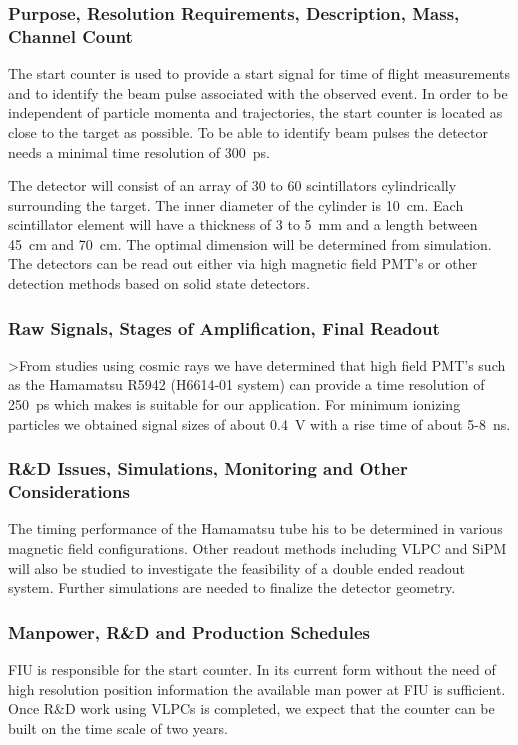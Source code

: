 \subsubsection*{Purpose, Resolution Requirements, Description, Mass, Channel Count}
The start counter is used to provide a start signal for
time of flight measurements and to identify  the beam pulse associated
with the observed event. In order to be independent of particle momenta
and trajectories, the start counter is located as close to the target as
possible. To be able to identify beam pulses the detector
needs a minimal time resolution of 300~ps. 

The detector will consist of an array of 30 to 60 scintillators
cylindrically surrounding the target. The inner diameter of the
cylinder is 10~cm. Each scintillator element will have  
a thickness of 3 to 5~mm and a length between 45~cm and
70~cm. The optimal dimension will be determined from simulation. The
detectors can be read out either via high magnetic field PMT's or
other detection methods based on solid state detectors.     

\subsubsection*{Raw Signals, Stages of Amplification, Final Readout}
>From studies using cosmic rays we have determined that high field
PMT's such as the Hamamatsu R5942 (H6614-01 system) can provide a time
resolution of 250~ps which makes is suitable for our application. For
minimum ionizing particles we obtained signal sizes of about 0.4~V
with a rise time of about 5-8~ns.

\subsubsection*{R\&D Issues, Simulations, Monitoring and Other Considerations}
The timing performance of the Hamamatsu tube his to be determined in
various magnetic field configurations. Other readout methods including
VLPC and SiPM will also be studied to investigate the feasibility of a
double ended readout system. Further simulations are needed to finalize
the detector geometry.

\subsubsection*{Manpower, R\&D and Production Schedules}
FIU is responsible for the start counter. In its current form without
the need of high resolution position information the available man
power at FIU is sufficient. Once R\&D work using VLPCs is completed,
we expect that the counter can be built on the time scale of two years.



